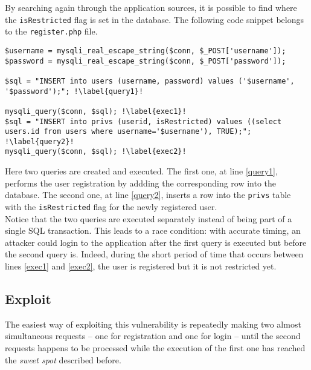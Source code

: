 By searching again through the application sources, it is possible to find where the \texttt{isRestricted} flag is set in the database. The following code snippet belongs to the \texttt{register.php} file.

\begin{verbatim}
$username = mysqli_real_escape_string($conn, $_POST['username']);
$password = mysqli_real_escape_string($conn, $_POST['password']);

$sql = "INSERT into users (username, password) values ('$username', '$password');"; !\label{query1}!

mysqli_query($conn, $sql); !\label{exec1}!
$sql = "INSERT into privs (userid, isRestricted) values ((select users.id from users where username='$username'), TRUE);"; !\label{query2}!
mysqli_query($conn, $sql); !\label{exec2}!
\end{verbatim}

Here two queries are created and executed. The first one, at line \ref{query1}, performs the user registration by addding the corresponding row into the database. The second one, at line \ref{query2}, inserts a row into the \texttt{privs} table with the \texttt{isRestricted} flag for the newly registered user. \\

Notice that the two queries are executed separately instead of being part of a single SQL transaction. This leads to a race condition: with accurate timing, an attacker could login to the application after the first query is executed but before the second query is. Indeed, during the short period of time that occurs between lines \ref{exec1} and \ref{exec2}, the user is registered but it is not restricted yet. \\

\subsection{Exploit}

The easiest way of exploiting this vulnerability is repeatedly making two almost simultaneous requests -- one for registration and one for login -- until the second requests happens to be processed while the execution of the first one has reached the \textit{sweet spot} described before.

